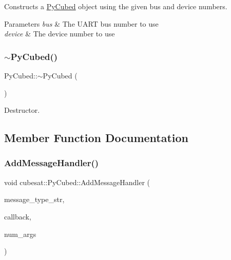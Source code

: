 Constructs a \hyperlink{classcubesat_1_1PyCubed}{Py\+Cubed} object using the given bus and device numbers. 


\begin{DoxyParams}{Parameters}
{\em bus} & The U\+A\+RT bus number to use \\
\hline
{\em device} & The device number to use \\
\hline
\end{DoxyParams}
\mbox{\label{classcubesat_1_1PyCubed_ae9a69fbb6fb5df1d15984b0e11727aaa}} 
\subsubsection{\texorpdfstring{$\sim$\+Py\+Cubed()}{~PyCubed()}}
{\footnotesize\ttfamily Py\+Cubed\+::$\sim$\+Py\+Cubed (\begin{DoxyParamCaption}{ }\end{DoxyParamCaption})\hspace{0.3cm}{\ttfamily [virtual]}}



Destructor. 



\subsection{Member Function Documentation}
\mbox{\label{classcubesat_1_1PyCubed_a1607d57f2cd19bd3b75a2c3dbbfa4955}} 
\subsubsection{\texorpdfstring{Add\+Message\+Handler()}{AddMessageHandler()}}
{\footnotesize\ttfamily void cubesat\+::\+Py\+Cubed\+::\+Add\+Message\+Handler (\begin{DoxyParamCaption}\item[{const std\+::string \&}]{message\+\_\+type\+\_\+str,  }\item[{\hyperlink{namespacecubesat_a3b98f17d41bf0e37fe0d382b897f9692}{Py\+Cubed\+Message\+Handler\+Callback}}]{callback,  }\item[{int}]{num\+\_\+args }\end{DoxyParamCaption})\hspace{0.3cm}{\ttfamily [inline]}}



